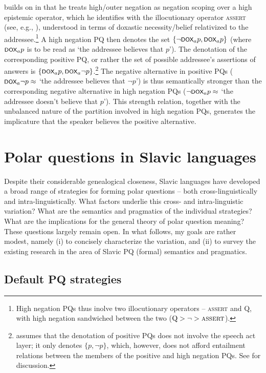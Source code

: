 \documentclass[output=paper,colorlinks,citecolor=brown]{langscibook}
\begin{document}
\citet{Goodhue2022} builds on \citet{Romero.Han2004} in that he treats high/outer negation as negation scoping over a high epistemic operator, which he identifies with the illocutionary operator \textsc{assert} (see, e.g., \citealt{Meyer2013}), understood in terms of doxastic necessity/belief relativized to the addressee.\footnote{High negation PQs thus inolve two illocutionary operators -- \textsc{assert} and Q, with high negation sandwiched between the two ($\text{Q}>\neg>\textsc{assert}$).} A high negation PQ then denotes the set $\{\neg\cnst{dox}_a p,\cnst{dox}_a p\}$ (where $\cnst{dox}_a p$ is to be read as `the addressee believes that $p$'). The denotation of the corresponding positive PQ, or rather the set of possible addressee's assertions of answers is $\{\cnst{dox}_a p,\cnst{dox}_a \neg p\}$.\footnote{\citet{Goodhue2022} assumes that the denotation of positive PQs does not involve the speech act layer; it only denotes $\{p,\neg p\}$, which, however, does not afford entailment relations between the members of the positive and high negation PQs. See \citet{Goodhue2022} for discussion.\label{sim:fn:goodhue-pos}} The negative alternative in positive PQs ($\cnst{dox}_a \neg p\approx$ `the addressee believes that $\neg p$') is thus semantically stronger than the corresponding negative alternative in high negation PQs ($\neg\cnst{dox}_a p\approx$ `the addressee doesn't believe that $p$'). This strength relation, together with the unbalanced nature of the partition involved in high negation PQs, generates the implicature that the speaker believes the positive alternative.

\section{Polar questions in Slavic languages}\label{sim:sec:slavic}

Despite their considerable genealogical closeness, Slavic languages have developed a broad range of strategies for forming polar questions -- both cross-lin\-guistically and intra-linguistically. What factors underlie this cross- and intra-linguistic variation? What are the semantics and pragmatics of the individual strat\-e\-gies? What are the implications for the general theory of polar question meaning? These questions largely remain open. In what follows, my goals are rather modest, namely (i) to concisely characterize the variation, and (ii) to survey the existing research in the area of Slavic PQ (formal) semantics and pragmatics.

\subsection{Default PQ strategies}\label{sim:sec:default}
\end{document}
